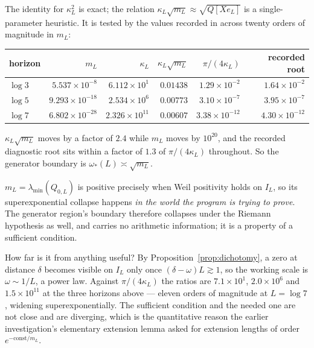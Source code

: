 The identity for $\kappa_L^2$ is exact; the relation
$\kappa_L\sqrt{m_L}\approx\sqrt{Q[Xe_L]}$ is a single-parameter heuristic. It is
tested by the values recorded in \cite{CriticalPath} across twenty orders of
magnitude in $m_L$:

\begin{center}
\begin{tabular}{@{}lrrrrr@{}}
\toprule
horizon & $m_L$ & $\kappa_L$ & $\kappa_L\sqrt{m_L}$ & $\pi/(4\kappa_L)$
& recorded root\\
\midrule
$\log3$ & $5.537\times10^{-8}$  & $6.112\times10^{1}$  & $0.01438$
 & $1.29\times10^{-2}$ & $1.64\times10^{-2}$\\
$\log5$ & $9.293\times10^{-18}$ & $2.534\times10^{6}$  & $0.00773$
 & $3.10\times10^{-7}$ & $3.95\times10^{-7}$\\
$\log7$ & $6.802\times10^{-28}$ & $2.326\times10^{11}$ & $0.00607$
 & $3.38\times10^{-12}$ & $4.30\times10^{-12}$\\
\bottomrule
\end{tabular}
\end{center}

$\kappa_L\sqrt{m_L}$ moves by a factor of $2.4$ while $m_L$ moves by $10^{20}$,
and the recorded diagnostic root sits within a factor of $1.3$ of
$\pi/(4\kappa_L)$ throughout. So the generator boundary is
$\omega_*(L)\asymp\sqrt{m_L}$.

\begin{remark}\label{rem:artifact}
$m_L=\lambda_{\min}(Q_{0,L})$ is positive precisely when Weil positivity holds on
$I_L$, so its superexponential collapse happens \emph{in the world the program is
trying to prove}. The generator region's boundary therefore collapses under the
Riemann hypothesis as well, and carries no arithmetic information; it is a
property of a sufficient condition.

How far is it from anything useful? By Proposition~\ref{prop:dichotomy}, a zero at
distance $\delta$ becomes visible on $I_L$ only once $(\delta-\omega)L\gtrsim1$,
so the working scale is $\omega\sim1/L$, a power law. Against
$\pi/(4\kappa_L)$ the ratios are $7.1\times10^{1}$, $2.0\times10^{6}$ and
$1.5\times10^{11}$ at the three horizons above --- eleven orders of magnitude at
$L=\log7$, widening superexponentially. The sufficient condition and the needed
one are not close and are diverging, which is the quantitative reason the earlier
investigation's elementary extension lemma asked for extension lengths of order
$e^{-\mathrm{const}/m_L}$.
\end{remark}

